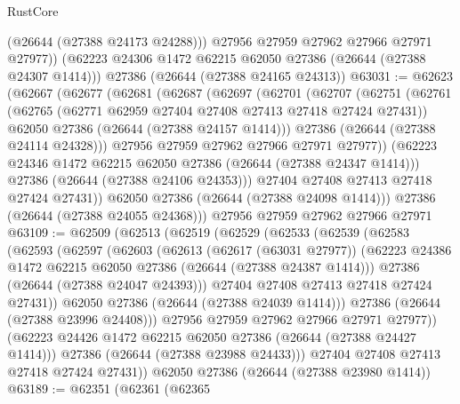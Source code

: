 \begin{lexlean}{RustCore}
\begin{coremodule}
          (@26644 (@27388 @24173 @24288)))
        @27956
        @27959
        @27962
        @27966
        @27971
        @27977))
    (@62223 @24306 @1472 @62215 @62050 @27386 (@26644 (@27388 @24307 @1414)))
    @27386
    (@26644 (@27388 @24165 @24313))
@63031 := @62623
    (@62667
      (@62677
        (@62681
          (@62687
            (@62697
              (@62701
                (@62707
                  (@62751
                    (@62761
                      (@62765 (@62771 @62959 @27404 @27408 @27413 @27418 @27424 @27431))
                      @62050
                      @27386
                      (@26644 (@27388 @24157 @1414)))
                    @27386
                    (@26644 (@27388 @24114 @24328)))
                  @27956
                  @27959
                  @27962
                  @27966
                  @27971
                  @27977))
              (@62223 @24346 @1472 @62215 @62050 @27386 (@26644 (@27388 @24347 @1414)))
              @27386
              (@26644 (@27388 @24106 @24353)))
            @27404
            @27408
            @27413
            @27418
            @27424
            @27431))
        @62050
        @27386
        (@26644 (@27388 @24098 @1414)))
      @27386
      (@26644 (@27388 @24055 @24368)))
    @27956
    @27959
    @27962
    @27966
    @27971
@63109 := @62509
    (@62513
      (@62519
        (@62529
          (@62533
            (@62539
              (@62583
                (@62593
                  (@62597
                    (@62603
                      (@62613
                        (@62617 (@63031 @27977))
                        (@62223 @24386 @1472 @62215 @62050 @27386 (@26644 (@27388 @24387 @1414)))
                        @27386
                        (@26644 (@27388 @24047 @24393)))
                      @27404
                      @27408
                      @27413
                      @27418
                      @27424
                      @27431))
                  @62050
                  @27386
                  (@26644 (@27388 @24039 @1414)))
                @27386
                (@26644 (@27388 @23996 @24408)))
              @27956
              @27959
              @27962
              @27966
              @27971
              @27977))
          (@62223 @24426 @1472 @62215 @62050 @27386 (@26644 (@27388 @24427 @1414)))
          @27386
          (@26644 (@27388 @23988 @24433)))
        @27404
        @27408
        @27413
        @27418
        @27424
        @27431))
    @62050
    @27386
    (@26644 (@27388 @23980 @1414))
@63189 := @62351
    (@62361
      (@62365

\end{coremodule}
\end{lexlean}
